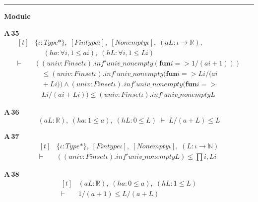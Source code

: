 \vspace{4pt}\noindent\rule{\columnwidth}{0.4pt}\par\vspace{2pt}
\noindent\textbf{Module }\par\vspace{3pt}

\noindent\textbf{A\,35}\quad{}
{\footnotesize\[ \begin{aligned}[t]
&\{ \iota : \mathit{Type}*\},\; [\mathit{Fintype} \iota ],\; [\mathit{Nonempty} \iota ],\; (\mathit{a} \mathit{L} : \iota \to \mathbb{R} ),\\
&\quad \; (\mathit{ha} : \forall \mathit{i}, 1 \leq \mathit{a} \mathit{i}),\; (\mathit{hL} : \forall \mathit{i}, 1 \leq \mathit{L} \mathit{i})\\
\vdash\;&((\mathit{univ} : \mathit{Finset} \iota ).\mathit{inf'} \mathit{univ\_nonempty} (\mathbf{fun} \mathit{i} => 1/(\mathit{a} \mathit{i} + 1)))\\
&\quad \leq (\mathit{univ} : \mathit{Finset} \iota ).\mathit{inf'} \mathit{univ\_nonempty} (\mathbf{fun} \mathit{i} => \mathit{L} \mathit{i}/(\mathit{a} \mathit{i}\\
&\quad + \mathit{L} \mathit{i})) \wedge (\mathit{univ} : \mathit{Finset} \iota ).\mathit{inf'} \mathit{univ\_nonempty} (\mathbf{fun} \mathit{i} =>\\
&\quad \mathit{L} \mathit{i}/(\mathit{a} \mathit{i} + \mathit{L} \mathit{i})) \leq (\mathit{univ} : \mathit{Finset} \iota ).\mathit{inf'} \mathit{univ\_nonempty} \mathit{L}
\end{aligned} \]}

\noindent\textbf{A\,36}\quad{}
{\footnotesize\[ (\mathit{a} \mathit{L} : \mathbb{R} ),\; (\mathit{ha} : 1 \leq \mathit{a}),\; (\mathit{hL} : 0 \leq \mathit{L}) \;\vdash\; \mathit{L}/(\mathit{a} + \mathit{L}) \leq \mathit{L} \]}

\noindent\textbf{A\,37}\quad{}
{\footnotesize\[ \begin{aligned}[t]
&\{ \iota : \mathit{Type}*\},\; [\mathit{Fintype} \iota ],\; [\mathit{Nonempty} \iota ],\; (\mathit{L} : \iota \to \mathbb{N} )\\
\vdash\;&((\mathit{univ} : \mathit{Finset} \iota ).\mathit{inf'} \mathit{univ\_nonempty} \mathit{L}) \leq \textstyle\prod \mathit{i}, \mathit{L} \mathit{i}
\end{aligned} \]}

\noindent\textbf{A\,38}\quad{}
{\footnotesize\[ \begin{aligned}[t]
&(\mathit{a} \mathit{L} : \mathbb{R} ),\; (\mathit{ha} : 0 \leq \mathit{a}),\; (\mathit{hL} : 1 \leq \mathit{L})\\
\vdash\;&1/(\mathit{a} + 1) \leq \mathit{L}/(\mathit{a} + \mathit{L})
\end{aligned} \]}

